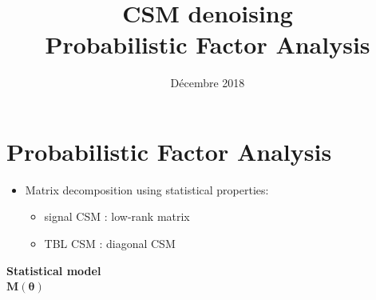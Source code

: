 \documentclass[10pt,xcolor=x11names,compress, notes=show]{beamer}%
\title{CSM denoising \\ Probabilistic Factor Analysis}
\subtitle{}
\date{\small \vfill Décembre 2018}
\newcommand*\circled[1]{\tikz[baseline=(char.base)]{
            \node[shape=circle,draw,inner sep=2pt,color=main,fill=main!10, line width=1pt] (char) {#1};}}
\newcommand{\marktikz}[1]{ \tikz[remember picture,overlay]\node (#1) {};}
\begin{document}
\begin{frame}[plain,t]
	\maketitle	
\end{frame}

\section*{Probabilistic Factor Analysis}
\begin{frame}[t]{\insertsectionhead}
\begin{itemize}
        \item Matrix decomposition using statistical properties:
        \begin{itemize}
        		\item  signal CSM : low-rank matrix
        		\item TBL CSM : diagonal CSM
	\end{itemize}
\end{itemize}
	\centering
	 {\bfseries Statistical model}\\
	 $\displaystyle \bm{M\left( \bm{\theta} \right)}$\\[1em]
 

\end{frame}
\end{document}

